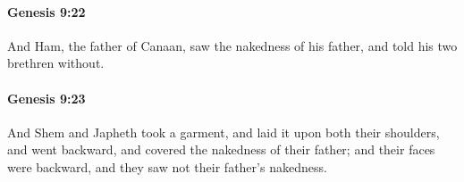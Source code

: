 		\paragraph{Genesis 9:22} %
			\label{GENESIS-9-22}

			And Ham, the father of Canaan, saw the nakedness of his father, and told his two brethren without.


		\paragraph{Genesis 9:23} %
			\label{GENESIS-9-23}

			And Shem and Japheth took a garment, and laid it upon both their shoulders, and went backward, and covered the nakedness of their father; and their faces were backward, and they saw not their father's nakedness.


